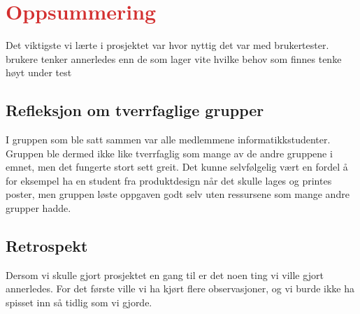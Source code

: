 \section{\textcolor[HTML]{D32F2F}{Oppsummering}}
Det viktigste vi lærte i prosjektet var hvor nyttig det var med brukertester.
brukere tenker annerledes enn de som lager
vite hvilke behov som finnes
tenke høyt under test

\subsection{Refleksjon om tverrfaglige grupper}
I gruppen som ble satt sammen var alle medlemmene informatikkstudenter. Gruppen ble dermed ikke like tverrfaglig som mange av de andre gruppene i emnet, men det fungerte stort sett greit. Det kunne selvfølgelig vært en fordel å for eksempel ha en student fra produktdesign når det skulle lages og printes poster, men gruppen løste oppgaven godt selv uten ressursene som mange andre grupper hadde.

\subsection{Retrospekt}
Dersom vi skulle gjort prosjektet en gang til er det noen ting vi ville gjort annerledes. For det første ville vi ha kjørt flere observasjoner, og vi burde ikke ha spisset inn så tidlig som vi gjorde.

